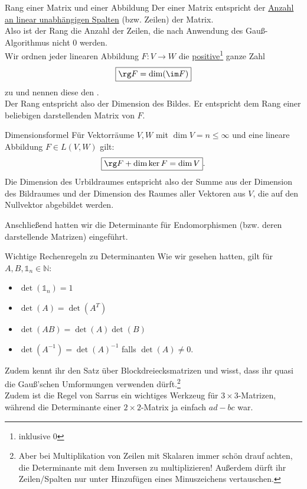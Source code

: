 \begin{Wiederholung}
{Rang einer Matrix und einer Abbildung}
Der  einer Matrix entspricht der \underline{Anzahl an linear unabhängigen Spalten} (bzw. Zeilen) der Matrix.\\
Also ist der Rang die Anzahl der Zeilen, die nach Anwendung des Gauß-Algorithmus nicht 0 werden.\\
Wir ordnen jeder linearen Abbildung $F:V\to W$ die \underline{positive}\footnote{inklusive 0} ganze Zahl
\begin{equation}
    \boxed{\rg F=\dim(\im F)}
\end{equation}
zu und nennen diese den .\\
Der Rang entspricht also der Dimension des Bildes. Er entspricht dem Rang einer beliebigen darstellenden Matrix von $F$.
\end{Wiederholung}
\begin{Wiederholung}{Dimensionsformel}
Für Vektorräume $V,W$ mit $\dim V=n\leq \infty$ und eine lineare Abbildung $F\in L(V,W)$ gilt:
\begin{equation*}
    \boxed{\rg F+\dim \ker F=\dim V}.
\end{equation*}
Die Dimension des Urbildraumes entspricht also der Summe aus der Dimension des Bildraumes und der Dimension des Raumes aller Vektoren aus $V$, die auf den Nullvektor abgebildet werden.
\end{Wiederholung}
Anschließend hatten wir die Determinante für Endomorphismen (bzw. deren darstellende Matrizen) eingeführt.
\begin{Wiederholung}{Wichtige Rechenregeln zu Determinanten}
Wie wir gesehen hatten, gilt für $A, B, \mathds{1}_n\in\mathbb{N}$:
\begin{itemize}
    \item $\det(\mathds{1}_n)=1$
    \item $\det(A)=\det(A^T)$
    \item $\det(AB)=\det(A)\det(B)$
    \item $\det(A^{-1})=\det(A)^{-1}$ falls $\det (A)\neq0$.
\end{itemize}
Zudem kennt ihr den Satz über Blockdreiecksmatrizen und wisst, dass ihr quasi die Gauß'schen Umformungen verwenden dürft.\footnote{Aber bei Multiplikation von Zeilen mit Skalaren immer schön drauf achten, die Determinante mit dem Inversen zu multiplizieren! Außerdem dürft ihr Zeilen/Spalten nur unter Hinzufügen eines Minuszeichens vertauschen.}\\
Zudem ist die Regel von Sarrus ein wichtiges Werkzeug für $3\times 3$-Matrizen, während die Determinante einer $2\times2$-Matrix ja einfach $ad-bc$ war.
\end{Wiederholung}

